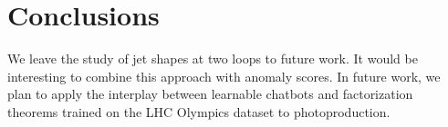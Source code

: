 \section{Conclusions}\label{sec:conclusions}

We leave the study of jet shapes at two loops to future work. It would
be interesting to combine this approach with anomaly scores. In future
work, we plan to apply the interplay between learnable chatbots and
factorization theorems trained on the LHC Olympics dataset to
photoproduction.


